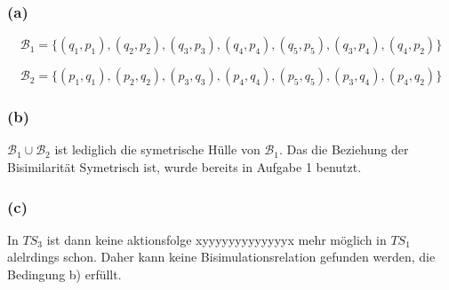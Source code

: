 \subsubsection*{(a)}

\[\mathcal{B}_1= \{ (q_1,p_1),(q_2,p_2),(q_3,p_3),(q_4,p_4),(q_5,p_5),(q_3,p_4 ),(q_4,p_2)\} \]

\[\mathcal{B}_2= \{ (p_1,q_1),(p_2,q_2),(p_3,q_3),(p_4,q_4),(p_5,q_5),(p_3,q_4 ),(p_4,q_2)\} \]

\subsubsection*{(b)}
$\mathcal{B}_1\cup \mathcal{B}_2$ ist lediglich die symetrische Hülle von $\mathcal{B}_1$. Das die Beziehung der Bisimilarität Symetrisch ist, wurde bereits in Aufgabe 1 benutzt.

\subsubsection*{(c)}
In $TS_3$ ist dann keine aktionsfolge xyyyyyyyyyyyyyx mehr möglich in $TS_1$ alelrdings schon. Daher kann keine Bisimulationsrelation gefunden werden, die Bedingung b) erfüllt.